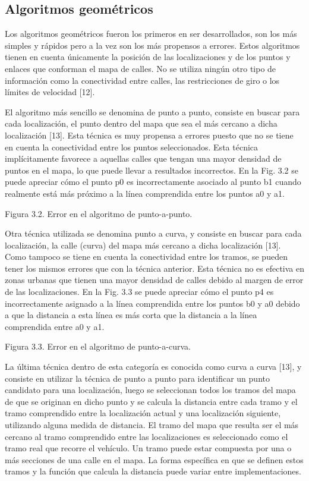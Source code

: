 \documentclass[final,fmstyle]{fpunathesis}
\begin{document}
\subsection{Algoritmos geométricos}

Los algoritmos geométricos fueron los primeros en ser desarrollados, son los más simples y rápidos pero a la vez son los más propensos a errores. Estos algoritmos tienen en cuenta únicamente la posición de las localizaciones y de los puntos y enlaces que conforman el mapa de calles. No se utiliza ningún otro tipo de información como la conectividad entre calles, las restricciones de giro o los límites de velocidad [12].

El algoritmo más sencillo se denomina de punto a punto, consiste en buscar para cada localización, el punto dentro del mapa que sea el más cercano a dicha localización [13]. Esta técnica es muy propensa a errores puesto que no se tiene en cuenta la conectividad entre los puntos seleccionados. Esta técnica implícitamente favorece a aquellas calles que tengan una mayor densidad de puntos en el mapa, lo que puede llevar a resultados incorrectos. En la Fig. 3.2 se puede apreciar cómo el punto p0 es incorrectamente asociado al punto b1 cuando realmente está más próximo a la línea comprendida entre los puntos a0 y a1. 

Figura 3.2. Error en el algoritmo de punto-a-punto.

Otra técnica utilizada se denomina punto a curva, y consiste en buscar para cada localización, la calle (curva) del mapa más cercano a dicha localización [13]. Como tampoco se tiene en cuenta la conectividad entre los tramos, se pueden tener los mismos errores que con la técnica anterior. Esta técnica no es efectiva en zonas urbanas que tienen una mayor densidad de calles debido al margen de error de las localizaciones. En la Fig. 3.3 se puede apreciar cómo el punto p4 es incorrectamente asignado a  la línea comprendida entre los puntos b0 y a0 debido a que la distancia a esta línea es más corta que la distancia a la línea comprendida entre a0 y a1.

Figura 3.3. Error en el algoritmo de punto-a-curva.

La última técnica dentro de esta categoría es conocida como curva a curva [13], y consiste en  utilizar la técnica de punto a punto para identificar un punto candidato para una localización, luego se seleccionan todos los tramos del mapa de que se originan en dicho punto y se calcula la distancia entre cada tramo y el tramo comprendido entre la localización actual y una localización siguiente, utilizando alguna medida de distancia. El tramo del mapa que resulta ser el más cercano al tramo comprendido entre las localizaciones es seleccionado como el tramo real que recorre el vehículo. Un tramo puede estar compuesta por una o más secciones de una calle en el mapa. La forma específica en que se definen estos tramos y la función que calcula la distancia puede variar entre implementaciones.
\end{document}
